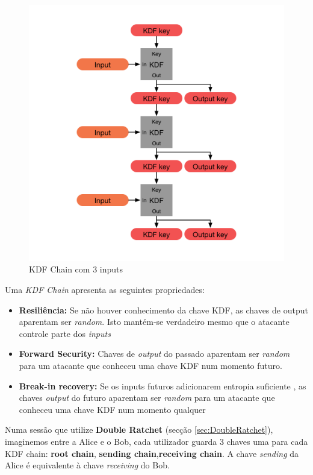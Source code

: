 \begin{figure}[H]
\begin{center}
\includegraphics[width=12cm]{img/kdfChain.png}
\caption{KDF Chain com 3 inputs}
\label{diagram:kdfChain}
\centering
\end{center}
\end{figure}

Uma \emph{KDF Chain} apresenta as seguintes propriedades:

\begin{itemize}
    \item \textbf{Resiliência:} Se não houver conhecimento da chave KDF, as chaves de output aparentam ser \emph{random}. Isto mantém-se verdadeiro mesmo que o atacante controle parte dos \emph{inputs}
    \item \textbf{Forward Security:} Chaves de \textit{output} do passado aparentam ser \emph{random} para um atacante que conheceu uma chave KDF num momento futuro.
    \item \textbf{Break-in recovery:} Se os inputs futuros adicionarem entropia suficiente , as chaves \textit{output} do futuro aparentam ser \emph{random} para um atacante que conheceu uma chave KDF num momento qualquer
\end{itemize}

Numa sessão que utilize \textbf{Double Ratchet} (secção \ref{sec:DoubleRatchet}), imaginemos entre a Alice e o Bob, cada utilizador guarda 3 chaves uma para cada KDF chain: \textbf{root chain}, \textbf{sending chain},\textbf{receiving chain}. A chave \textit{sending} da Alice é equivalente à chave \textit{receiving} do Bob.

